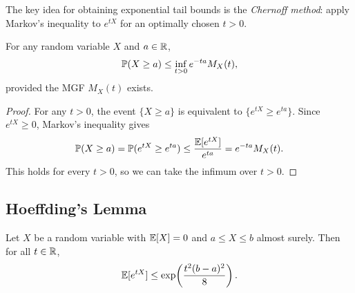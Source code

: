 \documentclass[11pt,a4paper]{article}
\begin{document}
The key idea for obtaining exponential tail bounds is the
\emph{Chernoff method}: apply Markov's inequality to $e^{tX}$ for
an optimally chosen $t > 0$.

\begin{proposition}
\label{prop:chernoff}
For any random variable $X$ and $a \in \mathbb{R}$,
\[
    \mathbb{P}(X \geq a) \leq \inf_{t > 0} e^{-ta} M_X(t),
\]
provided the MGF $M_X(t)$ exists.
\end{proposition}

\begin{proof}
For any $t > 0$, the event $\{X \geq a\}$ is equivalent to
$\{e^{tX} \geq e^{ta}\}$. Since $e^{tX} \geq 0$, Markov's
inequality gives
\[
    \mathbb{P}(X \geq a) = \mathbb{P}(e^{tX} \geq e^{ta})
    \leq \frac{\mathbb{E}[e^{tX}]}{e^{ta}} = e^{-ta} M_X(t).
\]
This holds for every $t > 0$, so we can take the infimum over $t > 0$.
\end{proof}

\subsection{Hoeffding's Lemma}

\begin{lemma}
\label{lem:hoeffding}
Let $X$ be a random variable with $\mathbb{E}[X] = 0$ and $a \leq X \leq b$
almost surely. Then for all $t \in \mathbb{R}$,
\[
    \mathbb{E}[e^{tX}] \leq \exp\!\left(\frac{t^2(b-a)^2}{8}\right).
\]
\end{lemma}
\end{document}
